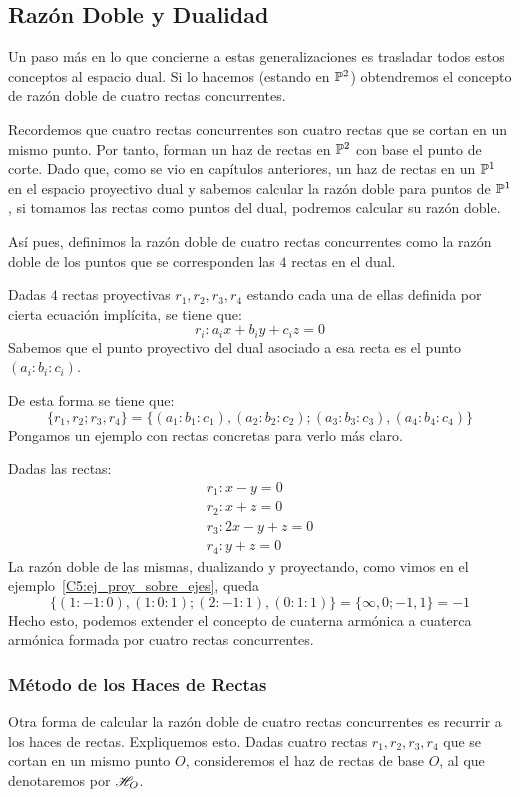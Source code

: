 \subsection{Razón Doble y Dualidad}
Un paso más en lo que concierne a estas generalizaciones es trasladar todos estos conceptos al espacio dual. Si lo hacemos (estando en $\mathbb{P}^2$) obtendremos el concepto de razón doble de cuatro rectas concurrentes.

Recordemos que cuatro rectas concurrentes son cuatro rectas que se cortan en un mismo punto. Por tanto, forman un haz de rectas en $\mathbb{P}^2$ con base el punto de corte. Dado que, como se vio en capítulos anteriores, un haz de rectas en un $\mathbb{P}^1$ en el espacio proyectivo dual y sabemos calcular la razón doble para puntos de $\mathbb{P}^1$, si tomamos las rectas como puntos del dual, podremos calcular su razón doble.

Así pues, definimos la razón doble de cuatro rectas concurrentes como la razón doble de los puntos que se corresponden las $4$ rectas en el dual.

Dadas $4$ rectas proyectivas $r_1,r_2,r_3,r_4$ estando cada una de ellas definida por cierta ecuación implícita, se tiene que:
\[r_i:a_ix+b_iy+c_iz=0\]
Sabemos que el punto proyectivo del dual asociado a esa recta es el punto $(a_i:b_i:c_i)$.

De esta forma se tiene que:
\[\{r_1,r_2;r_3,r_4\}=\{(a_1:b_1:c_1),(a_2:b_2:c_2);(a_3:b_3:c_3),(a_4:b_4:c_4)\}\]
Pongamos un ejemplo con rectas concretas para verlo más claro.
\begin{exa}
	Dadas las rectas:
	\[\begin{array}{c}
	r_1:x-y=0\\
	r_2:x+z=0\\
	r_3:2x-y+z=0\\
	r_4:y+z=0
	\end{array}\]
	La razón doble de las mismas, dualizando y proyectando, como vimos en el ejemplo~\ref{C5:ej_proy_sobre_ejes}, queda
	\[\{(1:-1:0),(1:0:1);(2:-1:1),(0:1:1)\}=\{\infty, 0; -1,1\}=-1\]
	Hecho esto, podemos extender el concepto de cuaterna armónica a cuaterca armónica formada por cuatro rectas concurrentes.
\end{exa}
\subsubsection{Método de los Haces de Rectas}
Otra forma de calcular la razón doble de cuatro rectas concurrentes es recurrir a los haces de rectas. Expliquemos esto. Dadas cuatro rectas $r_1,r_2,r_3,r_4$ que se cortan en un mismo punto $O$, consideremos el haz de rectas de base $O$, al que denotaremos por $\mathscr{H}_O$.